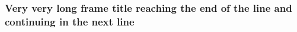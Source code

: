 \documentclass{beamer}
\begin{document}
\begin{frame}
\frametitle{Very very long frame title reaching the end of the line and continuing in the next line}
\end{frame}
\end{document}
